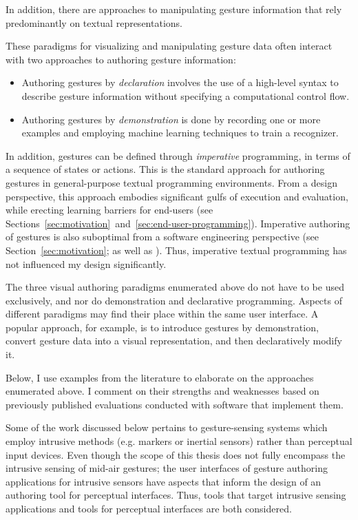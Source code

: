 In addition, there are approaches to manipulating gesture information that rely predominantly on textual representations.

These paradigms for visualizing and manipulating gesture data often interact with two approaches to authoring gesture information:

\begin{itemize}
\item Authoring gestures by \emph{declaration} involves the use of a high-level syntax to describe gesture information without specifying a computational control flow.
\item Authoring gestures by \emph{demonstration} is done by recording one or more examples and employing machine learning techniques to train a recognizer.
\end{itemize}

In addition, gestures can be defined through \emph{imperative} programming, in terms of a sequence of states or actions. This is the standard approach for authoring gestures in general-purpose textual programming environments. From a design perspective, this approach embodies significant gulfs of execution and evaluation, while erecting learning barriers for end-users (see Sections~\ref{sec:motivation}~and~\ref{sec:end-user-programming}). Imperative authoring of gestures is also suboptimal from a software engineering perspective (see Section~\ref{sec:motivation}; as well as \textcite{Hoste:2014}). Thus, imperative textual programming has not influenced my design significantly.

The three visual authoring paradigms enumerated above do not have to be used exclusively, and nor do demonstration and declarative programming. Aspects of different paradigms may find their place within the same user interface. A popular approach, for example, is to introduce gestures by demonstration, convert gesture data into a visual representation, and then declaratively modify it.

Below, I use examples from the literature to elaborate on the approaches enumerated above. I comment on their strengths and weaknesses based on previously published evaluations conducted with software that implement them.

Some of the work discussed below pertains to gesture-sensing systems which employ intrusive methods (e.g. markers or inertial sensors) rather than perceptual input devices. Even though the scope of this thesis does not fully encompass the intrusive sensing of mid-air gestures; the user interfaces of gesture authoring applications for intrusive sensors have aspects that inform the design of an authoring tool for perceptual interfaces. Thus, tools that target intrusive sensing applications and tools for perceptual interfaces are both considered.

